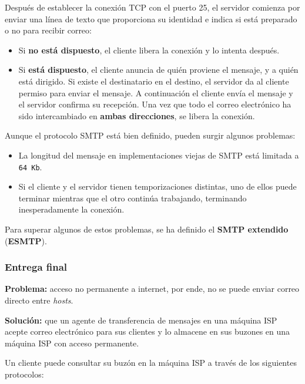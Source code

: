 \documentclass[10pt,a4paper]{article}
\begin{document}
Después de establecer la conexión TCP con el puerto 25, el servidor comienza por enviar una línea de texto que proporciona su identidad e indica si está preparado o no para recibir correo:

\begin{itemize}
\item Si \textbf{no está dispuesto}, el cliente libera la conexión y lo intenta después.
\item Si \textbf{está dispuesto}, el cliente anuncia de quién proviene el mensaje, y a quién está dirigido. Si existe el destinatario en el destino, el servidor da al cliente permiso para enviar el mensaje. A continuación el cliente envía el mensaje y el servidor confirma su recepción. Una vez que todo el correo electrónico ha sido intercambiado en \textbf{ambas direcciones}, se libera la conexión.
\end{itemize}

Aunque el protocolo SMTP está bien definido, pueden surgir algunos problemas:

\begin{itemize}
\item La longitud del mensaje en implementaciones viejas de SMTP está limitada a \texttt{64 Kb}.
\item Si el cliente y el servidor tienen temporizaciones distintas, uno de ellos puede terminar mientras que el otro continúa trabajando, terminando inesperadamente la conexión.
\end{itemize}

Para superar algunos de estos problemas, se ha definido el \textbf{SMTP extendido} (\textbf{ESMTP}).

\subsubsection{Entrega final}

\begin{description}
\item \textbf{Problema:} acceso no permanente a internet, por ende, no se puede enviar correo directo entre \textit{hosts}.
\item \textbf{Solución:} que un agente de transferencia de mensajes en una máquina ISP acepte correo electrónico para sus clientes y lo almacene en sus buzones en una máquina ISP con acceso permanente.
\end{description}

Un cliente puede consultar su buzón en la máquina ISP a través de los siguientes protocolos:
\end{document}
